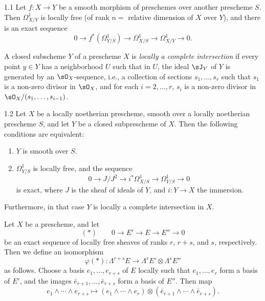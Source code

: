 \begin{bookproposition}{1.1}\label{prop:3.1.1}
\cite[--61, II,~4.3]{SGA} Let $f\colon X\to Y$ be a smooth morphism of preschemes over another prescheme $S$. Then $\Omega^1_{X/Y}$ is locally free (of rank $n=$ relative dimension of $X$ over $Y$), and there is an exact sequence
\[
0 \longrightarrow f^*(\Omega^1_{Y/S}) \longrightarrow \Omega^1_{X/S} \longrightarrow \Omega^1_{X/Y} \longrightarrow 0.
\]
\end{bookproposition}

\begin{definition*}
A closed subscheme $Y$ of a prescheme $X$ is \emph{locally a complete intersection} if every point $y\in Y$ has a neighborhood $U$ such that in $U$, the ideal $\sJ_Y$ of $Y$ is generated by an $\sO_X$-sequence, i.e., a collection of sections $s_1,\dots,s_r$ such that $s_1$ is a non-zero divisor in $\sO_X$, and for each $i=2,\dots,r$, $s_i$ is a non-zero divisor in $\sO_X/(s_1,\dots,s_{i-1})$.
\end{definition*}

\begin{bookproposition}{1.2}\label{prop:3.1.2}
\cite[--61, II,~4.10]{SGA} Let $X$ be a locally noetherian prescheme, smooth over a locally noetherian prescheme $S$, and let $Y$ be a closed subprescheme of $X$. Then the following conditions are equivalent:
\begin{enumerate}
\item[(i)] $Y$ is smooth over $S$.
\item[(ii)] $\Omega^1_{Y/S}$ is locally free, and the sequence
\[
0 \longrightarrow J/J^2 \longrightarrow i^*\Omega^1_{X/S} \longrightarrow \Omega^1_{Y/S} \longrightarrow 0
\]
is exact, where $J$ is the sheaf of ideals of $Y$, and $i\colon Y\to X$ the immersion.
\end{enumerate}
Furthermore, in that case $Y$ is locally a complete intersection in $X$.
\end{bookproposition}

\begin{definition*}
Let $X$ be a prescheme, and let
\[
(*)\qquad 0 \longrightarrow E' \longrightarrow E \longrightarrow E'' \longrightarrow 0
\]
be an exact sequence of locally free sheaves of ranks $r$, $r+s$, and $s$, respectively. Then we define an isomorphism
\[
\varphi(*)\colon \Lambda^{r+s}E \longrightarrow \Lambda^r E' \otimes \Lambda^s E''
\]
as follows. Choose a basis $e_1,\dots,e_{r+s}$ of $E$ locally such that $e_1,\dots,e_r$ form a basis of $E'$, and the images $\bar{e}_{r+1},\dots,\bar{e}_{r+s}$ form a basis of $E''$. Then map
\[
e_1\wedge\cdots\wedge e_{r+s} \longmapsto (e_1\wedge\cdots\wedge e_r)\otimes(\bar{e}_{r+1}\wedge\cdots\wedge\bar{e}_{r+s}).
\]
\end{definition*}

